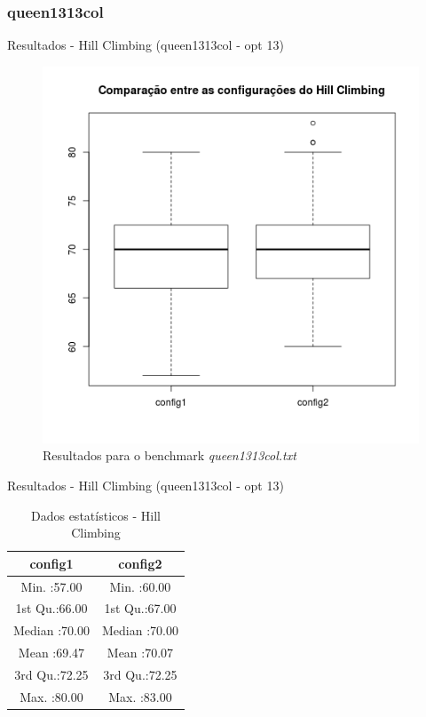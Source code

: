 \documentclass[compress, hide notes]{beamer}
\begin{document}
        \subsubsection{queen1313col}
		
        \begin{frame}{Resultados - Hill Climbing (queen1313col - opt 13)}
        
        	\begin{figure}[H]
			\centering
            \label{fig:sol-hc-queen1313col}
            \includegraphics[width=0.6\linewidth]{img/hill-sol-queen1313col.png}
            \caption[Resultados para o benchmark queen1313col.txt]{Resultados para o benchmark \textit{queen1313col.txt}}
			\end{figure}

		\end{frame}
        
        \begin{frame}{Resultados - Hill Climbing (queen1313col - opt 13)}
        
        	\begin{table}[H]
            \centering
              \begin{tabular}{c|c}
                \textbf{config1}      & 		   \textbf{config2}                    \\ \hline \hline
               Min.   :57.00 &          Min.   :60.00          \\ \hline
               1st Qu.:66.00 &         1st Qu.:67.00           \\ \hline
               Median :70.00 &         Median :70.00           \\ \hline
               Mean   :69.47 &         Mean   :70.07           \\ \hline
               3rd Qu.:72.25 &         3rd Qu.:72.25           \\ \hline
               Max.   :80.00 &         Max.   :83.00           \\ 
              \end{tabular}
              \caption {Dados estatísticos - Hill Climbing}
        	\end{table}
        
        \end{frame}
        
\end{document}
